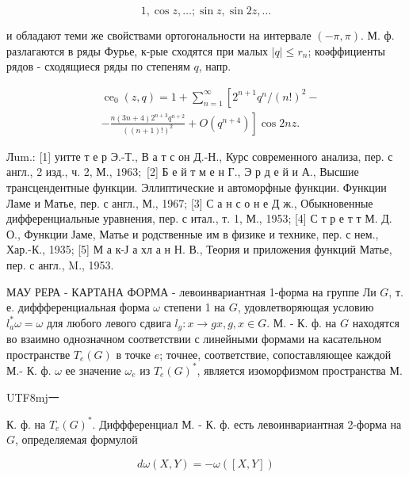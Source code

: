 \documentclass[10pt]{article}
\begin{document}
\[

1, \cos z, \ldots ; \sin z, \sin 2 z, \ldots

\]



и обладают теми же свойствами ортогональности на интервале $(-\pi, \pi)$. М. ф. разлагаются в ряды Фурье, к-рые сходятся при малых $|q| \leqslant r_{n}$; коәффициенты рядов - сходящиеся ряды по степеням $q$, напр.



\[

\begin{aligned}

& \operatorname{ce}_{0}(z, q)=1+\sum_{n=1}^{\infty}\left[2^{n+1} q^{n} /(n !)^{2}-\right. \\

& \left.-\frac{n(3 n+4) 2^{n+3} q^{n+2}}{((n+1) !)^{2}}+O\left(q^{n+4}\right)\right] \cos 2 n z .

\end{aligned}

\]



Лum.: [1] уитте т е р Э.-Т., В а т с он Д.-Н., Курс современного анализа, пер. с англ., 2 изд., ч. 2, М., $1963 ;$ [2] Б е й т м е н Г., Э р д е й и А., Высшие трансцендентные функции. Эллиптические и автоморфные функции. Функции Ламе и Матье, пер. с англ., М., 1967; [3] С а н с о н е Д ж., Обыкновенные дифференциальные уравнения, пер. с итал., т. 1, М., 1953; [4] С т р е т т М. Д. О., Функции Јаме, Матье и родственные им в физике и технике, пер. с нем., Хар.-К., 1935; [5] М а к-Ј а хл а н Н. В., Теория и приложения функций Матье, пер. с англ., M., 1953.



МАУ РЕРА - КАРТАНА ФОРМА - левоинвариантная 1-форма на группе Ли $G$, т. е. диффференциальная форма $\omega$ степени 1 на $G$, удовлетворяющая условию $l_{a}^{*} \omega=\omega$ для любого левого сдвига $l_{g}: x \rightarrow g x, g, x \in G$. М. - К. ф. на $G$ находятся во взаимно однозначном соответствии с линейными формами на касательном пространстве $T_{e}(G)$ в точке $e$; точнее, соответствие, сопоставляющее каждой М.- К. ф. $\omega$ ее значение $\omega_{e}$ из $T_{e}(G)^{*}$, является изоморфизмом пространства М. \begin{CJK}{UTF8}{mj}一\end{CJK} К. ф. на $T_{e}(G)^{*}$. Диффференциал М. - К. ф. есть левоинвариантная 2-форма на $G$, определяемая формулой



\[

d \omega(X, Y)=-\omega([X, Y])

\]
\end{document}
